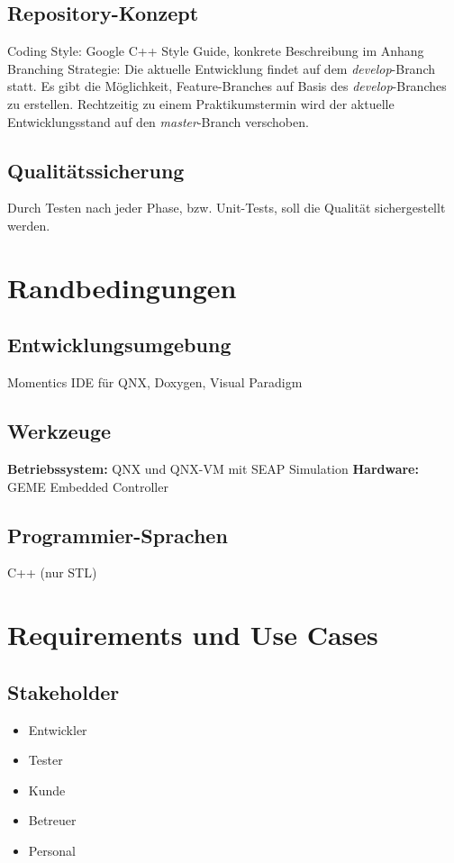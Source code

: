 \documentclass[oneside,a4paper,titlepage]{scrartcl} %
\begin{document}
\subsection{Repository-Konzept}
Coding Style: Google C++ Style Guide, konkrete Beschreibung im Anhang\newline
Branching Strategie: Die aktuelle Entwicklung findet auf dem \emph{develop}-Branch statt. Es gibt die Möglichkeit, Feature-Branches auf Basis des \emph{develop}-Branches zu erstellen. Rechtzeitig zu einem Praktikumstermin wird der aktuelle Entwicklungsstand auf den \emph{master}-Branch verschoben.  

\subsection{Qualitätssicherung}
Durch Testen nach jeder Phase, bzw. Unit-Tests, soll die Qualität sichergestellt werden.

\newpage

\section{Randbedingungen}

\subsection{Entwicklungsumgebung}
Momentics IDE für QNX, Doxygen, Visual Paradigm

\subsection{Werkzeuge}
\textbf{Betriebssystem:} QNX und QNX-VM mit SEAP Simulation\newline
\textbf{Hardware:} GEME Embedded Controller

\subsection{Programmier-Sprachen}
C++ (nur STL)

\section{Requirements und Use Cases}

\subsection{Stakeholder}
\begin{itemize}
    \item Entwickler
    \item Tester
    \item Kunde
    \item Betreuer
    \item Personal
\end{itemize}
\end{document}

